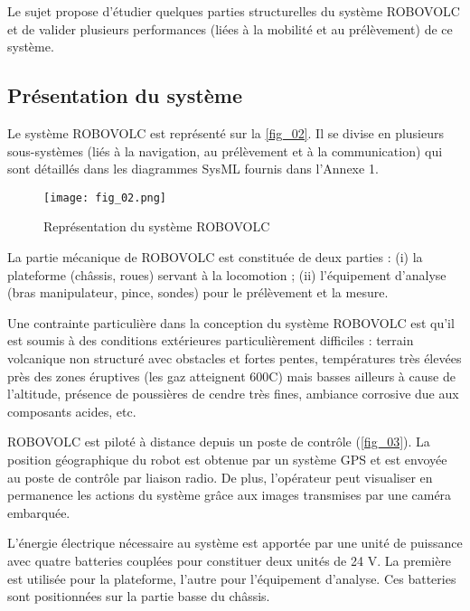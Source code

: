\begin{obj}
Le sujet propose d'étudier quelques parties structurelles du système ROBOVOLC et de
valider plusieurs performances (liées à la mobilité et au prélèvement) de ce système. 
\end{obj}

\subsection{Présentation du système}


Le système ROBOVOLC est représenté sur la \autoref{fig_02}. Il se divise en plusieurs sous-systèmes
(liés à la navigation, au prélèvement et à la communication) qui sont détaillés dans les
diagrammes SysML fournis dans l'Annexe 1. 

\begin{figure}[H]
\centering
\texttt{[image: fig\_02.png]}
\caption{Représentation du système ROBOVOLC \label{fig_02}}
\end{figure}

La partie mécanique de ROBOVOLC est constituée de deux parties : (i) la plateforme (châssis,
roues) servant à la locomotion ; (ii) l'équipement d'analyse (bras manipulateur, pince, sondes) pour
le prélèvement et la mesure.

Une contrainte particulière dans la conception du système ROBOVOLC est qu'il est soumis à des
conditions extérieures particulièrement difficiles : terrain volcanique non structuré avec obstacles et
fortes pentes, températures très élevées près des zones éruptives (les gaz atteignent 600\degres C) mais
basses ailleurs à cause de l'altitude, présence de poussières de cendre très fines, ambiance
corrosive due aux composants acides, etc.



ROBOVOLC est piloté à distance depuis un poste de contrôle (\autoref{fig_03}). La position géographique
du robot est obtenue par un système GPS et est envoyée au poste de contrôle par liaison radio.
De plus, l’opérateur peut visualiser en permanence les actions du système grâce aux images
transmises par une caméra embarquée.

L'énergie électrique nécessaire au système est apportée par une unité de puissance avec quatre
batteries couplées pour constituer deux unités de 24 V. La première est utilisée pour la plateforme,
l'autre pour l'équipement d'analyse. Ces batteries sont positionnées sur la partie basse du châssis.

